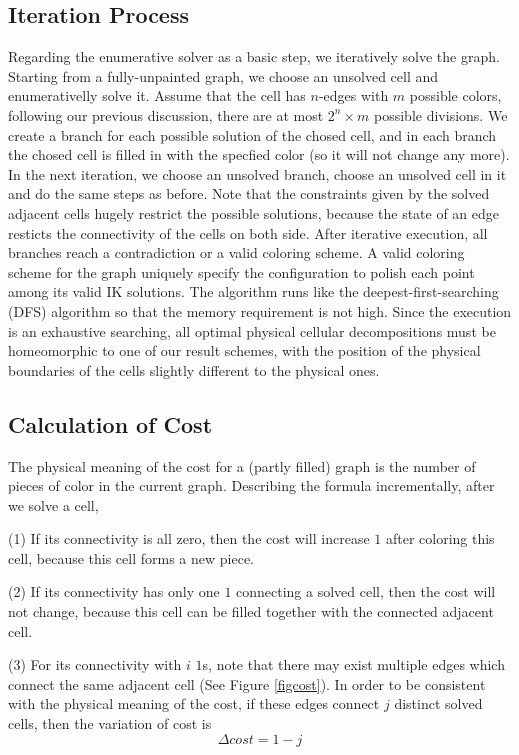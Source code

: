 \documentclass[journal]{IEEEtran}
\begin{document}
\subsection{Iteration Process}
Regarding the enumerative solver as a basic step, we iteratively solve the graph. 
Starting from a fully-unpainted graph, we choose an unsolved cell and enumerativelly solve it. 
Assume that the cell has $n$-edges with $m$ possible colors, following our previous discussion, there are at most $2^n\times m$ possible divisions. We create a branch for each possible solution of the chosed cell, and in each branch the chosed cell is filled in with the specfied color (so it will not change any more). 
In the next iteration, we choose an unsolved branch, choose an unsolved cell in it and do the same steps as before. 
Note that the constraints given by the solved adjacent cells hugely restrict the possible solutions, because the state of an edge resticts the connectivity of the cells on both side. 
After iterative execution, all branches reach a contradiction or a valid coloring scheme. A valid coloring scheme for the graph uniquely specify the configuration to polish each point among its valid IK solutions. 
The algorithm runs like the deepest-first-searching (DFS) algorithm so that the memory requirement is not high. 
Since the execution is an exhaustive searching, all optimal physical cellular decompositions must be homeomorphic to one of our result schemes, with the position of the physical boundaries of the cells slightly different to the physical ones.

\subsection{Calculation of Cost}
The physical meaning of the cost for a (partly filled) graph is the number of pieces of color in the current graph. 
Describing the formula incrementally, after we solve a cell, 

(1) If its connectivity is all zero, then the cost will increase $1$ after coloring this cell, because this cell forms a new piece.

(2) If its connectivity has only one $1$ connecting a solved cell, then the cost will not change, because this cell can be filled together with the connected adjacent cell. 

(3) For its connectivity with $i$ $1$s, note that there may exist multiple edges which connect the same adjacent cell (See Figure \ref{figcost}). In order to be consistent with the physical meaning of the cost, if these edges connect $j$ distinct solved cells, then the variation of cost is 
$$\Delta cost = 1-j$$
\end{document}
